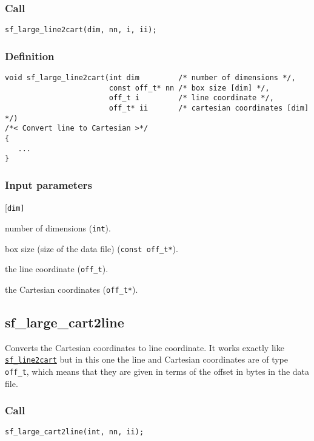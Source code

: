\subsubsection*{Call}
\begin{verbatim}sf_large_line2cart(dim, nn, i, ii);\end{verbatim}

\subsubsection*{Definition}
\begin{verbatim}
void sf_large_line2cart(int dim         /* number of dimensions */, 
                        const off_t* nn /* box size [dim] */, 
                        off_t i         /* line coordinate */, 
                        off_t* ii       /* cartesian coordinates [dim] */)
/*< Convert line to Cartesian >*/
{
   ...
}
\end{verbatim}


\subsubsection*{Input parameters}
\begin{desclist}{\tt }{\quad}[\tt dim]
   \setlength\itemsep{0pt}
   \item[dim] number of dimensions (\texttt{int}). 
   \item[nn]  box size (size of the data file) (\texttt{const off\_t*}).  
   \item[i]   the line coordinate (\texttt{off\_t}). 
   \item[ii]  the Cartesian coordinates (\texttt{off\_t*}).  
\end{desclist}




\subsection{{sf\_large\_cart2line}}
Converts the Cartesian coordinates to line coordinate. It works exactly like \hyperref[sec:sf_line2cart]{\texttt{sf\_line2cart}} but in this one the line and Cartesian coordinates are of type \texttt{off\_t}, which means that they are given in terms of the offset in bytes in the data file.


\subsubsection*{Call}
\begin{verbatim}sf_large_cart2line(int, nn, ii);\end{verbatim}


